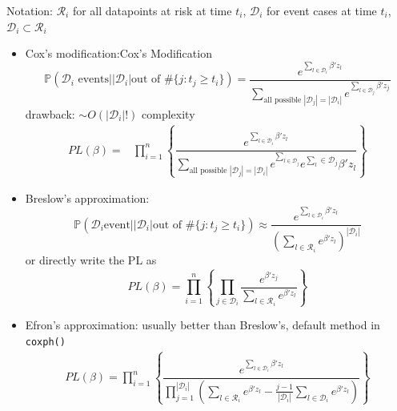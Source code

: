 Notation: $\mathcal{R}_i $ for all datapoints at risk at time $ t_i $, $ \mathcal{D}_i $ for event cases at time $ t_i $, $ \mathcal{D}_i\subset \mathcal{R}_i $
\begin{itemize}[topsep=2pt,itemsep=0pt]
    \item Cox's modification:\indexname{Cox's Modification}
    \begin{equation}
        \mathbb{P}\left( \mathcal{D}_i \text{ events}\Big| |\mathcal{D}_i |\text{out of }\# \{j:t_j\geq t_i\}  \right)=\dfrac{e^{\sum_{l\in\mathcal{D}_i }\beta'z_l }}{\sum_{\text{all possible }|\mathcal{D}_j|=|\mathcal{D}_i | }e^{\sum_{l\in\mathcal{D}_j }\beta'z_j} }
    \end{equation}
    drawback: $ \sim O(|\mathcal{D}_i|!) $ complexity
    \begin{align}
        PL(\beta )=&\prod_{i=1}^n\left\{ \dfrac{e^{\sum_{l\in\mathcal{D}_i}\beta 'z_l}}{\sum_{\text{all possible }|\mathcal{D}_j|=|\mathcal{D}_i|}e^{\sum_{l\in\mathcal{D}_j}}e^{\sum_{l}\in\mathcal{D}_j}\beta 'z_l} \right\} 
    \end{align}
    
    
    \item Breslow's approximation:
    \begin{equation}
        \mathbb{P}\left( \mathcal{D}_i \text{event}\Big| |\mathcal{D}_i |\text{out of }\# \{j:t_j\geq t_i\}  \right)\approx \dfrac{e^{\sum_{l\in\mathcal{D}_i }\beta'z_l }}{\left(\sum_{l\in\mathcal{R}_i}e^{\beta 'z_l}\right)^{|\mathcal{D}_i|}}
    \end{equation}
    or directly write the PL as
    \begin{equation}
        PL(\beta )=\prod_{i=1}^n \left\{ \prod_{j\in\mathcal{D}_i}\dfrac{e^{\beta 'z_j}}{\sum_{l\in\mathcal{R}_i}e^{\beta 'z_l}} \right\}
    \end{equation}
    \item Efron's approximation: usually better than Breslow's, default method in \lstinline|coxph()|
    \begin{align}
        PL(\beta )=\prod_{i=1}^n\left\{ \dfrac{e^{\sum_{l\in\mathcal{D}_i}\beta 'z_l}}{ \prod_{j=1}^{|\mathcal{D}_i|}\left( \sum_{l\in\mathcal{R}_i}e^{\beta 'z_l}-\frac{j-1}{|\mathcal{D}_i|}\sum_{l\in\mathcal{D}_i}e^{\beta 'z_l} \right) } \right\} 
    \end{align}
    
    
\end{itemize}


